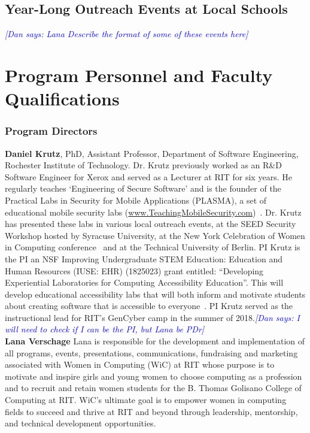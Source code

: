 \documentclass[12pt]{article}
\newcommand{\dan}[1]{\textcolor{blue}{{\it [Dan says: #1]}}}
\begin{document}
\subsection{Year-Long Outreach Events at Local Schools}

\dan{Lana Describe the format of some of these events here}






\section{Program Personnel and Faculty Qualifications}


\subsubsection{Program Directors}
\textbf{Daniel Krutz}, PhD, Assistant Professor, Department of Software Engineering, Rochester Institute of Technology.
Dr. Krutz previously worked as an R\&D Software Engineer for Xerox and served as a Lecturer at RIT for six years. He regularly teaches ‘Engineering of Secure Software’ and is the founder of the Practical Labs in Security for Mobile Applications (PLASMA), a set of educational mobile security labs (\url{www.TeachingMobileSecurity.com})~\cite{Krutz:2016:TAS:3018995.2994152}. Dr. Krutz has presented these labs in various local outreach events, at the SEED Security Workshop hosted by Syracuse University, at the New York Celebration of Women in Computing conference~\cite{nycwic_URL} and at the Technical University of Berlin. PI Krutz is the PI an NSF Improving Undergraduate STEM Education: Education and Human Resources  (IUSE: EHR) (1825023)\cite{NSF_IUSE_ALL_2018_URL} grant entitled: ``Developing Experiential Laboratories for Computing Accessibility Education''. This will develop educational accessibility labs that will both inform and motivate students about creating software that is accessible to everyone~\cite{El-Glaly:2018:AEM:3211407.3182184}. PI Krutz served as the instructional lead for RIT's GenCyber camp in the summer of 2018.\dan{I will need to check if I can be the PI, but Lana be PDr}\\


\noindent \textbf{Lana Verschage} Lana is responsible for the development and implementation of all programs, events, presentations, communications, fundraising and marketing associated with Women in Computing (WiC) at RIT whose purpose is to motivate and inspire girls and young women to choose computing as a profession and to recruit and retain women students for the B. Thomas Golisano College of Computing at RIT. WiC’s ultimate goal is to empower women in computing fields to succeed and thrive at RIT and beyond through leadership, mentorship, and technical development opportunities.
\end{document}
